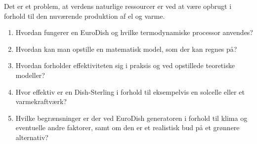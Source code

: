 \documentclass[SRC.tex]{subfiles}
\begin{document}
	Det er et problem, at verdens naturlige ressourcer er ved at være opbrugt i forhold til den nuværende produktion af el og varme.  
	\begin{enumerate}[-]
		\item Hvordan fungerer en EuroDish og hvilke termodynamiske processor anvendes?
		\item Hvordan kan man opstille en matematisk model, som der kan regnes på?
		\item Hvordan forholder effektiviteten sig i praksis og ved opstillede teoretiske modeller?
		\item Hvor effektiv er en Dish-Sterling i forhold til eksempelvis en solcelle eller et varmekraftværk?
		\item Hvilke begrænsninger er der ved  EuroDish generatoren i forhold til klima og eventuelle andre faktorer, samt om den er et realistisk bud på et grønnere alternativ? 
	\end{enumerate} 
\end{document}
